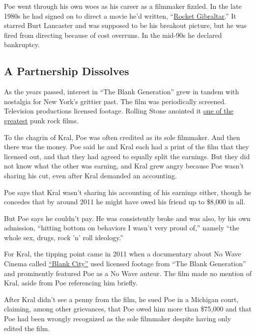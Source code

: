 Poe went through his own woes as his career as a filmmaker fizzled. In
the late 1980s he had signed on to direct a movie he'd written,
``\href{https://www.youtube.com/watch?v=YY0bqQhVoHM}{Rocket
Gibraltar}.'' It starred Burt Lancaster and was supposed to be his
breakout picture, but he was fired from directing because of cost
overruns. In the mid-90s he declared bankruptcy.

\hypertarget{a-partnership-dissolves}{%
\subsection{A Partnership Dissolves}\label{a-partnership-dissolves}}

As the years passed, interest in ``The Blank Generation'' grew in tandem
with nostalgia for New York's grittier past. The film was periodically
screened. Television productions licensed footage. Rolling Stone
anointed it
\href{https://www.rollingstone.com/movies/movie-lists/25-greatest-punk-rock-movies-of-all-time-103577/the-blank-generation-1976-104139/}{one
of the greatest} punk rock films.

To the chagrin of Kral, Poe was often credited as its sole filmmaker.
And then there was the money. Poe said he and Kral each had a print of
the film that they licensed out, and that they had agreed to equally
split the earnings. But they did not know what the other was earning,
and Kral grew angry because Poe wasn't sharing his cut, even after Kral
demanded an accounting.

Poe says that Kral wasn't sharing his accounting of his earnings either,
though he concedes that by around 2011 he might have owed his friend up
to \$8,000 in all.

But Poe says he couldn't pay. He was consistently broke and was also, by
his own admission, ``hitting bottom on behaviors I wasn't very proud
of,'' namely ``the whole sex, drugs, rock 'n' roll ideology.''

For Kral, the tipping point came in 2011 when a documentary about No
Wave Cinema called
\href{https://www.youtube.com/watch?v=entV87ujz58}{``Blank City''} used
licensed footage from ``The Blank Generation'' and prominently featured
Poe as a No Wave auteur. The film made no mention of Kral, aside from
Poe referencing him briefly.

After Kral didn't see a penny from the film, he sued Poe in a Michigan
court, claiming, among other grievances, that Poe owed him more than
\$75,000 and that Poe had been wrongly recognized as the sole filmmaker
despite having only edited the film.

